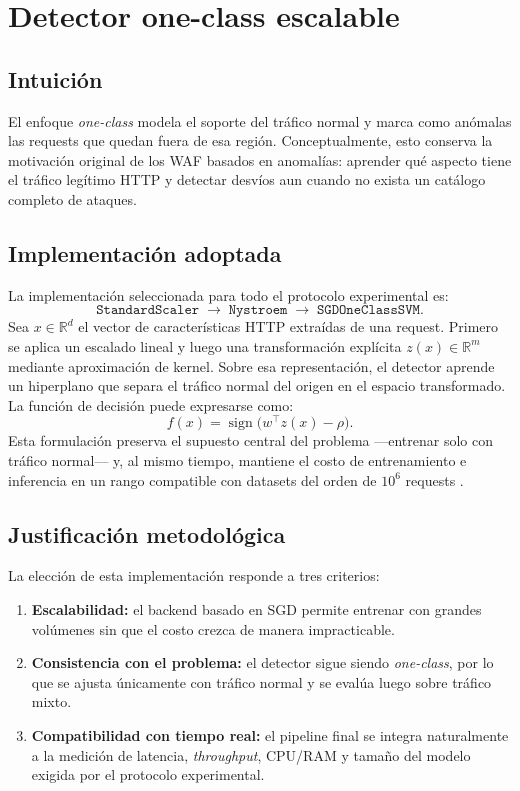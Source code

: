 \documentclass[12pt,oneside]{report}
\begin{document}
\section{Detector one-class escalable}
\subsection{Intuición}
El enfoque \textit{one-class} modela el soporte del tráfico normal y marca como anómalas las requests que quedan fuera de esa región. Conceptualmente, esto conserva la motivación original de los WAF basados en anomalías: aprender qué aspecto tiene el tráfico legítimo HTTP y detectar desvíos aun cuando no exista un catálogo completo de ataques.

\subsection{Implementación adoptada}
La implementación seleccionada para todo el protocolo experimental es:
\[
\texttt{StandardScaler} \;\rightarrow\; \texttt{Nystroem} \;\rightarrow\; \texttt{SGDOneClassSVM}.
\]
Sea $x \in \mathbb{R}^d$ el vector de características HTTP extraídas de una request. Primero se aplica un escalado lineal y luego una transformación explícita $z(x) \in \mathbb{R}^m$ mediante aproximación de kernel. Sobre esa representación, el detector aprende un hiperplano que separa el tráfico normal del origen en el espacio transformado. La función de decisión puede expresarse como:
\[
f(x)=\operatorname{sign}\big(w^\top z(x)-\rho\big).
\]
Esta formulación preserva el supuesto central del problema ---entrenar solo con tráfico normal--- y, al mismo tiempo, mantiene el costo de entrenamiento e inferencia en un rango compatible con datasets del orden de $10^6$ requests \cite{sklearn_sgd_ocsvm,sklearn_kernel_approx}.

\subsection{Justificación metodológica}
La elección de esta implementación responde a tres criterios:
\begin{enumerate}[leftmargin=*]
  \item \textbf{Escalabilidad:} el backend basado en SGD permite entrenar con grandes volúmenes sin que el costo crezca de manera impracticable.
  \item \textbf{Consistencia con el problema:} el detector sigue siendo \textit{one-class}, por lo que se ajusta únicamente con tráfico normal y se evalúa luego sobre tráfico mixto.
  \item \textbf{Compatibilidad con tiempo real:} el pipeline final se integra naturalmente a la medición de latencia, \textit{throughput}, CPU/RAM y tamaño del modelo exigida por el protocolo experimental.
\end{enumerate}
\end{document}

